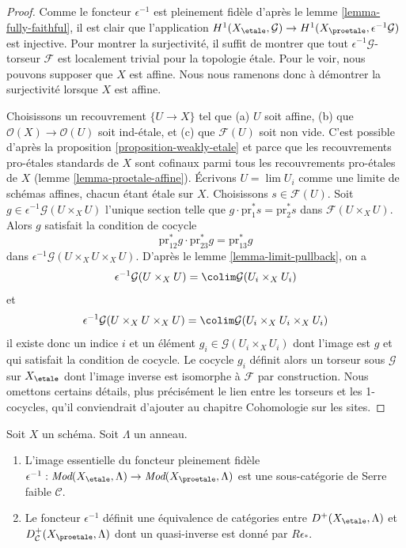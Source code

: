 \begin{proof}
Comme le foncteur $\epsilon^{-1}$ est pleinement fidèle d'après le
lemme \ref{lemma-fully-faithful},
il est clair que l'application
$H^1(X_\etale, \mathcal{G}) \to H^1(X_\proetale, \epsilon^{-1}\mathcal{G})$
est injective. Pour montrer la surjectivité, il suffit de montrer que
tout $\epsilon^{-1}\mathcal{G}$-torseur $\mathcal{F}$ est localement trivial pour la topologie \'etale.
Pour le voir, nous pouvons supposer que $X$ est affine.
Nous nous ramenons donc à démontrer la surjectivité lorsque $X$ est affine.

\medskip\noindent
Choisissons un recouvrement $\{U \to X\}$ tel que (a) $U$ soit affine, (b)
que $\mathcal{O}(X) \to \mathcal{O}(U)$ soit ind-\'etale, et (c) que $\mathcal{F}(U)$
soit non vide. C'est possible d'après la proposition \ref{proposition-weakly-etale}
et parce que les
recouvrements pro-\'etales standards de $X$ sont cofinaux parmi tous les recouvrements pro-\'etales
de $X$ (lemme \ref{lemma-proetale-affine}).
Écrivons $U = \lim U_i$ comme une limite de schémas affines, chacun étant \'etale sur $X$.
Choisissons $s \in \mathcal{F}(U)$. Soit
$g \in \epsilon^{-1}\mathcal{G}(U \times_X U)$
l'unique section telle que $g \cdot \text{pr}_1^*s = \text{pr}_2^*s$ dans
$\mathcal{F}(U \times_X U)$. Alors $g$ satisfait la condition de cocycle
$$
\text{pr}_{12}^*g \cdot \text{pr}_{23}^*g = \text{pr}_{13}^*g
$$
dans $\epsilon^{-1}\mathcal{G}(U \times_X U \times_X U)$. D'après le
lemme \ref{lemma-limit-pullback},
on a
$$
\epsilon^{-1}\mathcal{G}(U \times_X U) =
\colim \mathcal{G}(U_i \times_X U_i)
$$
et
$$
\epsilon^{-1}\mathcal{G}(U \times_X U \times_X U) =
\colim \mathcal{G}(U_i \times_X U_i \times_X U_i)
$$
il existe donc un indice $i$ et un élément $g_i \in \mathcal{G}(U_i \times_X U_i)$
dont l'image est $g$ et qui satisfait la condition de cocycle.
Le cocycle $g_i$ définit alors un torseur sous $\mathcal{G}$ sur
$X_\etale$ dont l'image inverse est isomorphe à $\mathcal{F}$
par construction. Nous omettons certains détails, plus précisément le lien
entre les torseurs et les 1-cocycles, qu'il conviendrait d'ajouter au chapitre
Cohomologie sur les sites.
\end{proof}

\begin{lemma}
\label{lemma-compare-derived}
Soit $X$ un schéma. Soit $\Lambda$ un anneau.
\begin{enumerate}
\item L'image essentielle du foncteur pleinement fidèle
$\epsilon^{-1} : \textit{Mod}(X_\etale, \Lambda) \to
\textit{Mod}(X_\proetale, \Lambda)$
est une sous-catégorie de Serre faible $\mathcal{C}$.
\item Le foncteur $\epsilon^{-1}$ définit une équivalence de catégories
entre $D^+(X_\etale, \Lambda)$ et $D^+_\mathcal{C}(X_\proetale, \Lambda)$
dont un quasi-inverse est donné par $R\epsilon_*$.
\end{enumerate}
\end{lemma}

